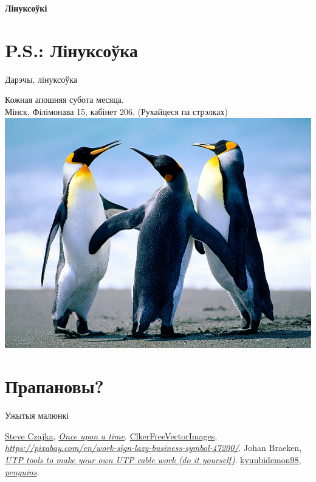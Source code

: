 \documentclass[ignorenonframetext,hyperref={pdftex,unicode}]{beamer}
\begin{document}
		\item \textbf{Лінуксоўкі} 
			\pause

\section{P.S.: Лінуксоўка}
\begin{frame}{Дарэчы, лінуксоўка}
	\begin{center}
		Кожная апошняя субота месяца.\\
		Мінск, Філімонава 15, кабінет 206. (Рухайцеся па стрэлках)
		\includegraphics[width=\textwidth,height=0.8\textheight,keepaspectratio]{penguins_by_kyuubidemon98}
	\end{center}
\end{frame}

\section{Прапановы?}

\begin{frame}{Ужытыя малюнкі}
	\begin{thebibliography}{10}
	\beamertemplatetextbibitems
		{\sc \href{https://www.flickr.com/photos/steveczajka/}{Steve Czajka}}, {\em \href{https://www.flickr.com/photos/steveczajka/11392783794}{Once upon a time}}.
		{\sc \href{https://pixabay.com/en/users/ClkerFreeVectorImages-3736/}{ClkerFreeVectorImages}}, {\em \url{https://pixabay.com/en/work-sign-lazy-business-symbol-47200/}}.
		{\sc Johan Braeken}, {\em \href{https://commons.wikimedia.org/wiki/File:Utp_diy_tools.jpg}{UTP tools to make your own UTP cable work (do it yourself)}}.
		{\sc \href{http://kyuubidemon98.deviantart.com/}{kyuubidemon98}}, {\em \href{http://kyuubidemon98.deviantart.com/art/penguins-156283137}{penguins}}.
	\end{thebibliography}
\end{frame}
\end{document}
